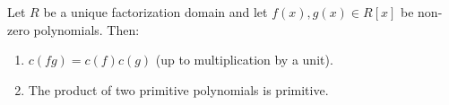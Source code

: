 Let $R$ be a unique factorization domain and let $f(x), g(x) \in R[x]$ be non-zero polynomials. Then:
\begin{enumerate}
\item $c(fg) = c(f) c(g)$ (up to multiplication by a unit).
\item The product of two primitive polynomials is primitive.
\end{enumerate}
